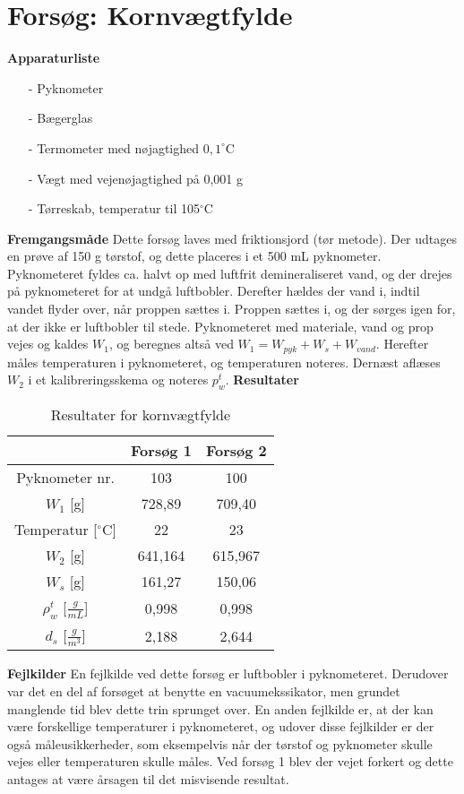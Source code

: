 \chapter{Forsøg: Kornvægtfylde}

\textbf{Apparaturliste}
\begin{itemize}
\item[-] Pyknometer
\item[-] Bægerglas
\item[-] Termometer med nøjagtighed $0,\!1^{\circ}$C
\item[-] Vægt med vejenøjagtighed på 0,001 g
\item[-] Tørreskab, temperatur til 105$^{\circ}$C
\end{itemize}

\textbf{Fremgangsmåde}
\newline
Dette forsøg laves med friktionsjord (tør metode). Der udtages en prøve af 150 g tørstof, og dette placeres i et 500 mL pyknometer. Pyknometeret fyldes ca. halvt op med luftfrit demineraliseret vand, og der drejes på pyknometeret for at undgå luftbobler. Derefter hældes der vand i, indtil vandet flyder over, når proppen sættes i. Proppen sættes i, og der sørges igen for, at der ikke er luftbobler til stede. Pyknometeret med materiale, vand og prop vejes og kaldes $W_{1}$, og beregnes altså ved $W_1 = W_{pyk} + W_s + W_{vand}$. Herefter måles temperaturen i pyknometeret, og temperaturen noteres. Dernæst aflæses $W_{2}$ i et kalibreringsskema og noteres $p_w^t$.
\newline
\newline
\textbf{Resultater}
\begin{table} [H]
\begin{center}
	\begin{tabular}{ |c|c|c| } 
		\hline
		 & Forsøg 1 & Forsøg 2 \\	\hline
		Pyknometer nr. & 103 & 100 \\	\hline
		$W_1$ [g] & 728,89 & 709,40 \\	\hline 
		Temperatur [$^{\circ}$C] & 22 & 23 \\ \hline
		$W_2$ [g] & 641,164 & 615,967 \\	\hline
		$W_s$ [g] & 161,27 & 150,06 \\	\hline
		$\rho_{w}^t$ [$\frac{g}{mL}$] & 0,998 & 0,998 \\	\hline
		$d_s$ [$\frac{g}{m^3}$] & 2,188 & 2,644	\\	\hline	
	\end{tabular}
	\caption{Resultater for kornvægtfylde}
	\label{tab:bilagc1}
\end{center}
\end{table}

\textbf{Fejlkilder}
\newline
En fejlkilde ved dette forsøg er luftbobler i pyknometeret. Derudover var det en del af forsøget at benytte en vacuumekssikator, men grundet manglende tid blev dette trin sprunget over. En anden fejlkilde er, at der kan være forskellige temperaturer i pyknometeret, og udover disse fejlkilder er der også måleusikkerheder, som eksempelvis når der tørstof og pyknometer skulle vejes eller temperaturen skulle måles. 
Ved forsøg 1 blev der vejet forkert og dette antages at være årsagen til det misvisende resultat.